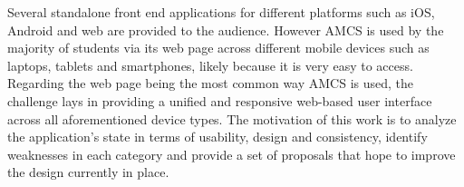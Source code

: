 \newline
\newline
Several standalone front end applications for different platforms such as iOS, Android and web are provided to the audience. However AMCS is used by the majority of students via its web page across different mobile devices such as laptops, tablets and smartphones, likely because it is very easy to access.
\newline
\newline 
Regarding the web page being the most common way AMCS is used, 
the challenge lays in providing a unified and responsive web-based user interface across all aforementioned device types. The motivation of this work is to analyze the application's state in terms of usability, design and consistency, identify weaknesses in each category and provide a set of proposals that hope to improve the design currently in place.

